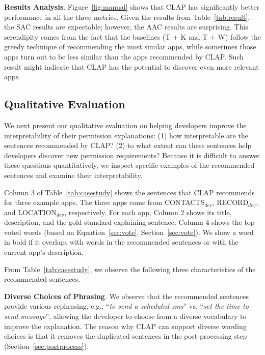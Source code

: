 {\bf Results Analysis}.  Figure~\ref{fig:manual} shows that CLAP has significantly better performance in all the three metrics. Given the results from Table~\ref{tab:result}, the SAC results are expectable; however, the AAC results are surprising. This serendipity comes from the fact that the baselines (T + K and T + W) follow the greedy technique of recommending the most similar apps, while sometimes those apps turn out to be less similar than the apps recommended by CLAP. 
Such result might indicate that CLAP has the potential to discover even more relevant apps. 




\subsection{Qualitative Evaluation}
\label{sec:quality}

We next present our qualitative evaluation on helping developers improve the interpretability of their permission explanations: (1) 
how interpretable are the sentences recommended by CLAP? 
(2) to what extent can these sentences help developers discover new permission requirements? 
Because it is difficult to answer these questions quantitatively, we inspect specific examples of the recommended sentences and examine their interpretability. 

Column 3 of Table~\ref{tab:casestudy} shows the sentences that CLAP recommends for three example apps. The three apps come from \textsf{CONTACTS}$_{dev}$, \textsf{RECORD}$_{dev}$, and \textsf{LOCATION}$_{dev}$,  respectively. 
For each app, Column 2 shows its title, description, and the gold-standard explaining sentence. 
Column 4 shows the top-voted words (based on Equation~\ref{sec:vote}, Section~\ref{sec:vote}). 
We show a word in bold if it overlaps with words in the recommended sentences or with the current app's description. 

From Table~\ref{tab:casestudy}, we observe the following three characteristics of the recommended sentences.

{\bf Diverse Choices of Phrasing}. 
We observe that the recommended sentences provide various rephrasing, e.g., ``\emph{to send a scheduled sms}'' vs. ``\emph{set the time to send message}'', allowing the developer to choose from a diverse vocabulary to improve the explanation. 
The reason why CLAP can support diverse wording choices is that it removes the duplicated sentences in the post-processing step (Section~\ref{sec:postprocess}). 

